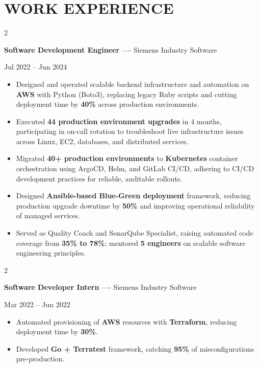 \documentclass[10pt, letterpaper]{article}
\newenvironment{highlights}{
    \begin{itemize}[
        topsep=0.10 cm,
        parsep=0.06 cm,
        partopsep=0pt,
        itemsep=0.06 cm,
        leftmargin=12pt
    ]
}{
    \end{itemize}
}
\newenvironment{twocolentry}[2][]{
    \onecolentry
    \def\secondColumn{#2}
    \setcolumnwidth{\fill, 4.5 cm}
    \begin{paracol}{2}
}{
    \switchcolumn \raggedleft \secondColumn
    \end{paracol}
    \endonecolentry
}
\begin{document}
\section{WORK EXPERIENCE}
\begin{twocolentry}{Jul 2022 -- Jun 2024}
\textbf{Software Development Engineer} ---- Siemens Industry Software
\end{twocolentry}
\begin{highlights}
  \item Designed and operated scalable backend infrastructure and automation on \textbf{AWS} with Python (Boto3), replacing legacy Ruby scripts and cutting deployment time by \textbf{40\%} across production environments.
  \item Executed \textbf{44 production environment upgrades} in 4 months, participating in on-call rotation to troubleshoot live infrastructure issues across Linux, EC2, databases, and distributed services.
  \item Migrated \textbf{40+ production environments} to \textbf{Kubernetes} container orchestration using ArgoCD, Helm, and GitLab CI/CD, adhering to CI/CD development practices for reliable, auditable rollouts.
  \item Designed \textbf{Ansible-based Blue-Green deployment} framework, reducing production upgrade downtime by \textbf{50\%} and improving operational reliability of managed services.
  \item Served as Quality Coach and SonarQube Specialist, raising automated code coverage from \textbf{35\% to 78\%}; mentored \textbf{5 engineers} on scalable software engineering principles.
\end{highlights}

\vspace{0.15 cm}

\begin{twocolentry}{Mar 2022 -- Jun 2022}
\textbf{Software Developer Intern} ---- Siemens Industry Software
\end{twocolentry}
\begin{highlights}
  \item Automated provisioning of \textbf{AWS} resources with \textbf{Terraform}, reducing deployment time by \textbf{30\%}.
  \item Developed \textbf{Go + Terratest} framework, catching \textbf{95\%} of misconfigurations pre-production.
\end{highlights}

\vspace{0.15 cm}
\end{document}
